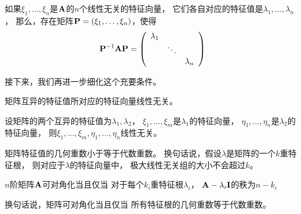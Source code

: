 \begin{remark}
  如果$\xi_1,\dots,\xi_n$是$\mmA$的$n$个线性无关的特征向量，
  它们各自对应的特征值是$\lambda_1,\dots,\lambda_n$，
  那么，存在矩阵$\mmP=(\xi_1,\dots,\xi_n)$，使得
  \begin{displaymath}
    \mmP^{-1}\mmA\mmP = \mmat{ccc}{
      \lambda_1 & & \\
      & \ddots    & \\
      & & \lambda_n }
  \end{displaymath}
\end{remark}

接下来，我们再进一步细化这个充要条件。
\begin{lemma}
  矩阵互异的特征值所对应的特征向量线性无关。
\end{lemma}

\begin{lemma}
  设矩阵的两个互异的特征值为$\lambda_1,\lambda_2$，
  $\xi_1,\dots,\xi_m$是$\lambda_1$的特征向量，
  $\eta_1,\dots,\eta_n$是$\lambda_2$的特征向量，
  则$\xi_1,\dots,\xi_m,\eta_1,\dots,\eta_n$线性无关。
\end{lemma}

\begin{lemma}
  矩阵特征值的几何重数小于等于代数重数。
  换句话说，假设$\lambda$是矩阵的一个$k$重特征根，
  则对应于$\lambda$的特征向量中，
  极大线性无关组的大小不会超过$k$。
\end{lemma}

\begin{theorem}[矩阵可对角化的充要条件]
  $n$阶矩阵$\mmA$可对角化当且仅当
  对于每个$k_i$重特征根$\lambda_i$，
  $\mmA-\lambda_i\mmI$的秩为$n-k_i$
\end{theorem}

\begin{remark}
  换句话说，矩阵可对角化当且仅当
  所有特征根的几何重数等于代数重数。
\end{remark}
